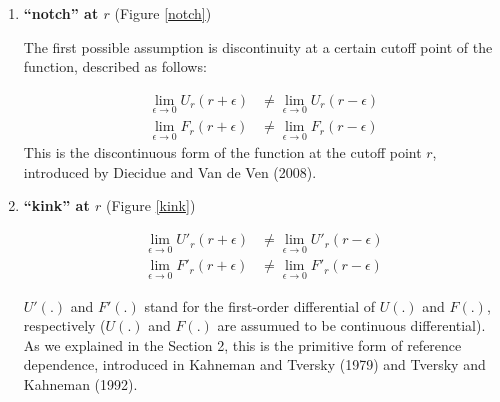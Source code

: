 \documentclass[dvipdfmx, 12pt]{article}
\begin{document}
\begin{enumerate}
  \item \textbf{``notch'' at $r$} (Figure \ref{notch})

  The first possible assumption is discontinuity at a certain cutoff point of the function, described as follows:

  \begin{align*}
    \lim_{\epsilon \to 0} U_r (r + \epsilon) & \neq
    \lim_{\epsilon \to 0} U_r (r - \epsilon) \\
    \lim_{\epsilon \to 0} F_r (r + \epsilon) & \neq
    \lim_{\epsilon \to 0} F_r (r - \epsilon)
  \end{align*}
  This is the discontinuous form of the function at the cutoff point $r$, introduced by Diecidue and Van de Ven (2008).

  \item \textbf{``kink'' at $r$} (Figure \ref{kink})

  \begin{align*}
    \lim_{\epsilon \to 0} U'_r (r + \epsilon) & \neq
    \lim_{\epsilon \to 0} U'_r (r - \epsilon) \\
    \lim_{\epsilon \to 0} F'_r (r + \epsilon) & \neq
    \lim_{\epsilon \to 0} F'_r (r - \epsilon)
  \end{align*}

  $U'(.)$ and $F'(.)$ stand for the first-order differential of $U(.)$ and $F(.)$, respectively ($U(.)$ and $F(.)$ are assumued to be continuous differential). As we explained in the Section 2, this is the primitive form of reference dependence, introduced in Kahneman and Tversky (1979) and Tversky and Kahneman (1992).
\end{enumerate}
\end{document}

